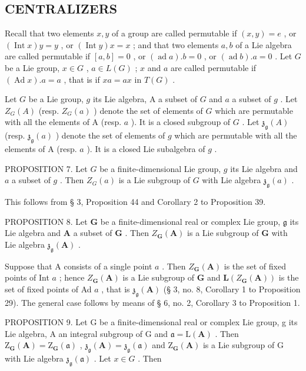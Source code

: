 \subsection{CENTRALIZERS}

Recall that two elements \(x, y\) of a group are called permutable if \((x, y) = e\) , or \((\operatorname{Int} x)y = y\) , or \((\operatorname{Int} y)x = x\) ; and that two elements \(a, b\) of a Lie algebra are called permutable if \([a, b] = 0\) , or \((\operatorname{ad} a).b = 0\) , or \((\operatorname{ad} b).a = 0\) . Let \(G\) be a Lie group, \(x \in G\) , \(a \in L(G)\) ; \(x\) and \(a\) are called permutable if \((\operatorname{Ad} x).a = a\) , that is if \(xa = ax\) in \(T(G)\) .

Let \(G\) be a Lie group, \(g\) its Lie algebra, A a subset of \(G\) and \(a\) a subset of \(g\) . Let \(Z_{G}(A)\) (resp. \(Z_{G}(a)\) ) denote the set of elements of \(G\) which are permutable with all the elements of A (resp. \(a\) ). It is a closed subgroup of \(G\) . Let \(\mathfrak{z}_{\mathfrak{g}}(A)\) (resp. \(\mathfrak{z}_{\mathfrak{g}}(a)\) ) denote the set of elements of \(g\) which are permutable with all the elements of A (resp. \(a\) ). It is a closed Lie subalgebra of \(g\) .

PROPOSITION 7. Let \(G\) be a finite-dimensional Lie group, \(g\) its Lie algebra and \(a\) a subset of \(g\) . Then \(Z_G(a)\) is a Lie subgroup of \(G\) with Lie algebra \(\mathfrak{z}_{\mathfrak{g}}(a)\) .

This follows from § 3, Proposition 44 and Corollary 2 to Proposition 39.

PROPOSITION 8. Let \(\mathbf{G}\) be a finite-dimensional real or complex Lie group, \(\mathfrak{g}\) its Lie algebra and \(\mathbf{A}\) a subset of \(\mathbf{G}\) . Then \(Z_{\mathbf{G}}(\mathbf{A})\) is a Lie subgroup of \(\mathbf{G}\) with Lie algebra \(\mathfrak{z}_{\mathfrak{g}}(\mathbf{A})\) .

Suppose that A consists of a single point \(a\) . Then \(Z_{\mathbf{G}}(\mathbf{A})\) is the set of fixed points of Int \(a\) ; hence \(Z_{\mathbf{G}}(\mathbf{A})\) is a Lie subgroup of \(\mathbf{G}\) and \(\mathbf{L}(Z_{\mathbf{G}}(\mathbf{A}))\) is the set of fixed points of Ad \(a\) , that is \(\mathfrak{z}_{\mathfrak{g}}(\mathbf{A})\) (§ 3, no. 8, Corollary 1 to Proposition 29). The general case follows by means of § 6, no. 2, Corollary 3 to Proposition 1.

PROPOSITION 9. Let G be a finite-dimensional real or complex Lie group, g its Lie algebra, A an integral subgroup of G and \(\mathfrak{a} = \mathrm{L}(\mathbf{A})\) . Then \(\mathrm{Z}_{\mathbf{G}}(\mathbf{A}) = \mathrm{Z}_{\mathbf{G}}(\mathfrak{a})\) , \(\mathfrak{z}_{\mathfrak{g}}(\mathbf{A}) = \mathfrak{z}_{\mathfrak{g}}(\mathfrak{a})\) and \(\mathrm{Z}_{\mathbf{G}}(\mathbf{A})\) is a Lie subgroup of G with Lie algebra \(\mathfrak{z}_{\mathfrak{g}}(\mathfrak{a})\) . Let \(x \in G\) . Then

